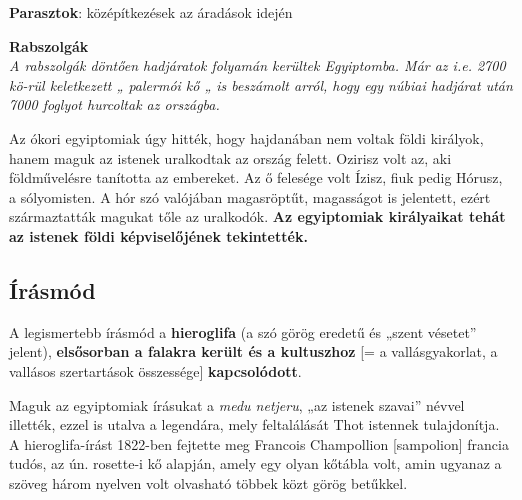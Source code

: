 \begin{compactitem}
	\item \textbf{Parasztok}: középítkezések az áradások idején
	
	\item \textbf{Rabszolgák}\\
	\textit{A rabszolgák döntően hadjáratok folyamán kerültek Egyiptomba. Már az i.e. 2700 kö-rül keletkezett „ palermói kő „ is beszámolt arról, hogy egy núbiai hadjárat  után 7000 foglyot hurcoltak az országba.}
\end{compactitem}

\vspace{0.5cm}

Az ókori egyiptomiak úgy hitték, hogy hajdanában nem voltak földi királyok, hanem maguk az istenek uralkodtak az ország felett. Ozirisz volt az, aki földművelésre tanította az embereket. Az ő felesége volt Ízisz, fiuk pedig Hórusz, a sólyomisten. A hór szó valójában magasröptűt, magasságot is jelentett, ezért származtatták magukat tőle az uralkodók. \textbf{Az egyiptomiak királyaikat tehát az istenek földi képviselőjének tekintették.}

\subsection*{Írásmód}

	\begin{figure}
	\end{figure}

	A legismertebb írásmód a \textbf{hieroglifa} (a szó görög eredetű és „szent vésetet” jelent), \textbf{elsősorban a falakra került és a kultuszhoz} [= a vallásgyakorlat, a vallásos szertartások összessége] \textbf{kapcsolódott}.
	
	Maguk az egyiptomiak írásukat a \textit{medu netjeru}, „az istenek szavai” névvel illették, ezzel is utalva a legendára, mely feltalálását Thot istennek tulajdonítja.
	A hieroglifa-írást 1822-ben fejtette meg Francois Champollion [sampolion] francia tudós, az ún. rosette-i kő alapján, amely egy olyan kőtábla volt, amin ugyanaz a szöveg három nyelven volt olvasható többek közt görög betűkkel.
	
